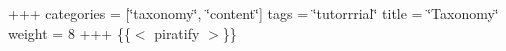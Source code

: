 +++ categories = \mbox{[}\char`\"{}taxonomy\char`\"{}, \char`\"{}content\char`\"{}\mbox{]} tags = \char`\"{}tutorrrial\char`\"{} title = \char`\"{}\+Taxonomy\char`\"{} weight = 8 +++ \{\{$<$ piratify $>$\}\} 